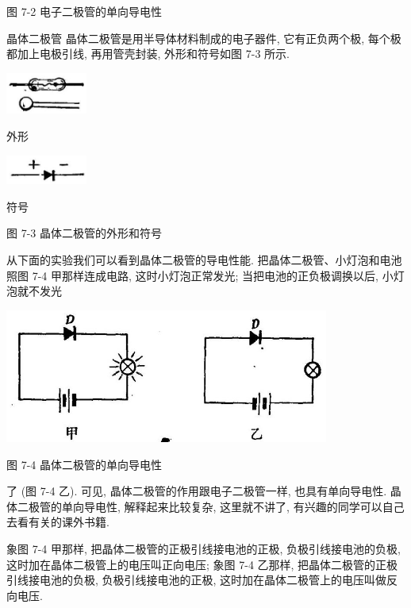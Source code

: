 \documentclass[10pt]{article}
\begin{document}
图 7-2 电子二极管的单向导电性

晶体二极管 晶体二极管是用半导体材料制成的电子器件, 它有正负两个极, 每个极都加上电极引线, 再用管壳封装, 外形和符号如图 7-3 所示.

\begin{center}
\includegraphics[max width=0.2\textwidth]{images/01913056-1f15-74d8-9184-9aab52c9d66b_222_143100.jpg}
\end{center}

外形

\begin{center}
\includegraphics[max width=0.2\textwidth]{images/01913056-1f15-74d8-9184-9aab52c9d66b_222_934991.jpg}
\end{center}

符号

图 7-3 晶体二极管的外形和符号

从下面的实验我们可以看到晶体二极管的导电性能. 把晶体二极管、小灯泡和电池照图 7-4 甲那样连成电路, 这时小灯泡正常发光; 当把电池的正负极调换以后, 小灯泡就不发光

\begin{center}
\includegraphics[max width=0.8\textwidth]{images/01913056-1f15-74d8-9184-9aab52c9d66b_223_455839.jpg}
\end{center}

图 7-4 晶体二极管的单向导电性

了 (图 7-4 乙). 可见, 晶体二极管的作用跟电子二极管一样, 也具有单向导电性. 晶体二极管的单向导电性, 解释起来比较复杂, 这里就不讲了, 有兴趣的同学可以自己去看有关的课外书籍.

象图 7-4 甲那样, 把晶体二极管的正极引线接电池的正极, 负极引线接电池的负极, 这时加在晶体二极管上的电压叫正向电压; 象图 7-4 乙那样, 把晶体二极管的正极引线接电池的负极, 负极引线接电池的正极, 这时加在晶体二极管上的电压叫做反向电压.
\end{document}

